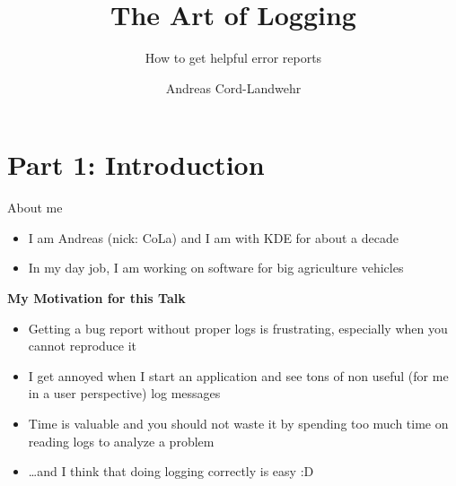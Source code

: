 \documentclass[t,compress,aspectratio=169]{beamer}
\title{The Art of Logging}
\subtitle{How to get helpful error reports}
\author{Andreas Cord-Landwehr}
\begin{document}
\begin{withoutheadline}
\begin{frame}
\titlepage
\end{frame}
\end{withoutheadline}


\section{Part 1: Introduction}

\begin{frame}
    {About me}

    \begin{itemize}
        \item I am Andreas (nick: CoLa) and I am with KDE for about a decade
        \item In my day job, I am working on software for big agriculture vehicles
    \end{itemize}
    \bigskip
    \pause

    \textbf{My Motivation for this Talk}
    \begin{itemize}
        \item Getting a bug report without proper logs is frustrating, especially when you cannot reproduce it
        \item I get annoyed when I start an application and see tons of non useful (for me in a user perspective) log messages
        \item Time is valuable and you should not waste it by spending too much time on reading logs to analyze a problem
        \item \dots and I think that doing logging correctly is easy :D
    \end{itemize}
\end{frame}
\end{document}
